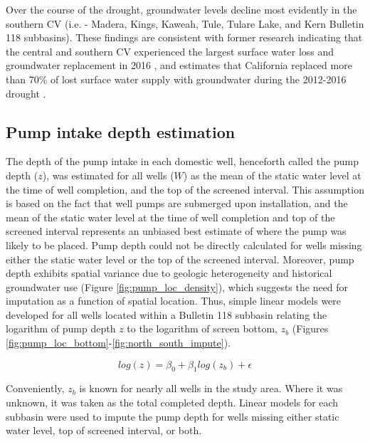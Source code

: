 Over the course of the drought, groundwater levels decline most evidently in the southern CV (i.e. - Madera, Kings, Kaweah, Tule, Tulare Lake, and Kern Bulletin 118 subbasins). These findings are consistent with former research indicating that the central and southern CV experienced the largest surface water loss and groundwater replacement in 2016 \cite{Medellin-azuara2016}, and estimates that California replaced more than 70\% of lost surface water supply with groundwater during the 2012-2016 drought \cite{Lund2018}. 


\subsection{Pump intake depth estimation}
\label{ap_a_pump_depth}


The depth of the pump intake in each domestic well, henceforth called the pump depth ($z$), was estimated for all wells ($W$) as the mean of the static water level at the time of well completion, and the top of the screened interval. This assumption is based on the fact that well pumps are submerged upon installation, and the mean of the static water level at the time of well completion and top of the screened interval represents an unbiased best estimate of where the pump was likely to be placed. Pump depth could not be directly calculated for wells missing either the static water level or the top of the screened interval. Moreover, pump depth exhibits spatial variance due to geologic heterogeneity and historical groundwater use (Figure \ref{fig:pump_loc_density}), which suggests the need for imputation as a function of spatial location. Thus, simple linear models were developed for all wells located within a Bulletin 118 subbasin relating the logarithm of pump depth $z$ to the logarithm of screen bottom, $z_{b}$ (Figures \ref{fig:pump_loc_bottom}-\ref{fig:north_south_impute}). 

\begin{equation}
  log(z) = \beta_{0} + \beta_{1}log(z_{b}) + \epsilon
\end{equation}

Conveniently, $z_{b}$ is known for nearly all wells in the study area. Where it was unknown, it was taken as the total completed depth. Linear models for each subbasin were used to impute the pump depth for wells missing either static water level, top of screened interval, or both.  

